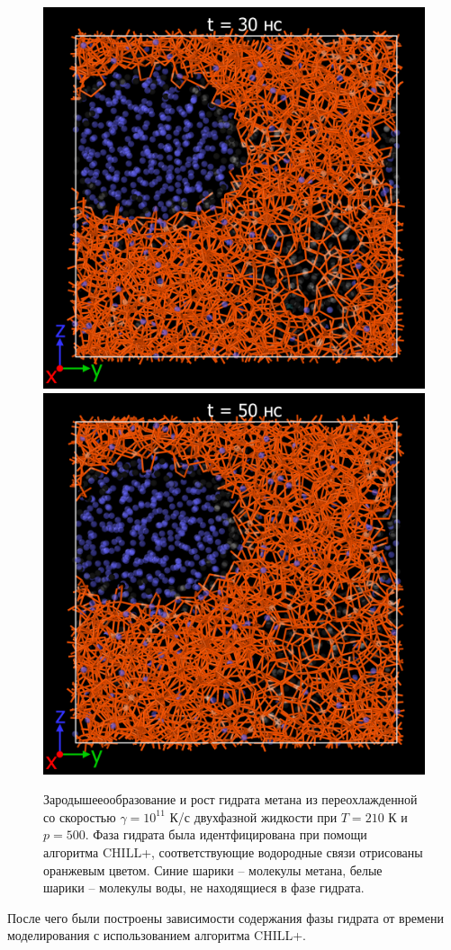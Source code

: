 \begin{figure}[H]
\begin{minipage}{\linewidth}
    \end{minipage}\vfill
    \begin{minipage}{\linewidth}
        \centering
        \includegraphics[width=.4\linewidth]{figures/nuclei5.png}
        \includegraphics[width=.4\linewidth]{figures/nuclei6.png}
    \end{minipage}
    \caption{Зародышееообразование и рост гидрата метана из переохлажденной со скоростью $\gamma=10^{11}$ К/с двухфазной жидкости при $T=210$ К и $p=500$. Фаза гидрата была идентфицирована при помощи алгоритма CHILL+, соответствующие водородные связи отрисованы оранжевым цветом. Синие шарики -- молекулы метана, белые шарики -- молекулы воды, не находящиеся в фазе гидрата.}
    \label{fig3.5}
\end{figure}

После чего были построены зависимости содержания фазы гидрата от времени моделирования с использованием алгоритма CHILL+.

